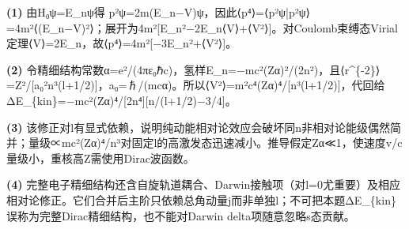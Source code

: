 \par\noindent\textbf{(1)} 由H₀ψ=E\_nψ得 p²ψ=2m(E\_n−V)ψ，因此⟨p⁴⟩=⟨p²ψ|p²ψ⟩=4m²⟨(E\_n−V)²⟩；展开为4m²[E\_n²−2E\_n⟨V⟩+⟨V²⟩]。对Coulomb束缚态Virial定理⟨V⟩=2E\_n，故⟨p⁴⟩=4m²[−3E\_n²+⟨V²⟩]。
\par\noindent\textbf{(2)} 令精细结构常数α=e²/(4πε₀ℏc)，氢样E\_n=−mc²(Zα)²/(2n²)，且⟨r\textasciicircum{}\{-2\}⟩=Z²/[a₀²n³(l+1/2)]，a₀=ℏ/(mcα)。所以⟨V²⟩=m²c⁴(Zα)⁴/[n³(l+1/2)]，代回给 ΔE\_\{kin\}=−mc²(Zα)⁴/[2n⁴][n/(l+1/2)−3/4]。
\par\noindent\textbf{(3)} 该修正对l有显式依赖，说明纯动能相对论效应会破坏同n非相对论能级偶然简并；量级∝mc²(Zα)⁴/n³对固定l的高激发态迅速减小。推导假定Zα≪1，使速度v/c量级小，重核高Z需使用Dirac波函数。
\par\noindent\textbf{(4)} 完整电子精细结构还含自旋轨道耦合、Darwin接触项（对l=0尤重要）及相应相对论修正。它们合并后主阶只依赖总角动量j而非单独l；不可把本题ΔE\_\{kin\}误称为完整Dirac精细结构，也不能对Darwin delta项随意忽略s态贡献。
